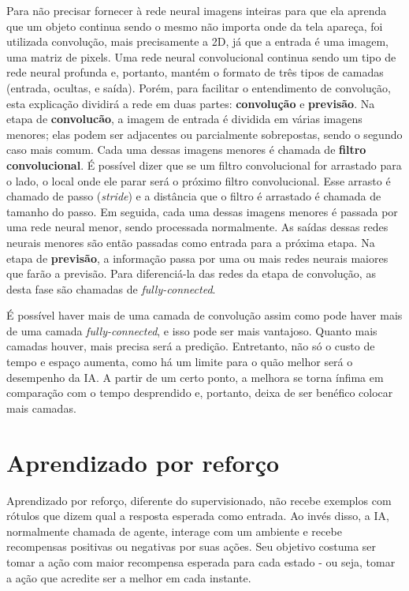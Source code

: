 Para não precisar fornecer à rede neural imagens inteiras para que ela aprenda que um objeto continua sendo o mesmo não importa onde da tela apareça, foi utilizada convolução, mais precisamente a 2D, já que a entrada é uma imagem, uma matriz de pixels.
Uma rede neural convolucional continua sendo um tipo de rede neural profunda e, portanto, mantém o formato de três tipos de camadas (entrada, ocultas, e saída). Porém, para facilitar o entendimento de convolução, esta explicação dividirá a rede em duas partes: \textbf{convolução} e \textbf{previsão}.
Na etapa de \textbf{convolucão}, a imagem de entrada é dividida em várias imagens menores; elas podem ser adjacentes ou parcialmente sobrepostas, sendo o segundo caso mais comum. Cada uma dessas imagens menores é chamada de \textbf{filtro convolucional}. É possível dizer que se um filtro convolucional for arrastado para o lado, o local onde ele parar será o próximo filtro convolucional. Esse arrasto é chamado de passo (\textit{stride}) e a distância que o filtro é arrastado é chamada de tamanho do passo. Em seguida, cada uma dessas imagens menores é passada por uma rede neural menor, sendo processada normalmente. As saídas dessas redes neurais menores são então passadas como entrada para a próxima etapa.
Na etapa de \textbf{previsão}, a informação passa por uma ou mais redes neurais maiores que farão a previsão. Para diferenciá-la das redes da etapa de convolução, as desta fase são chamadas de \textit{fully-connected}.

É possível haver mais de uma camada de convolução assim como pode haver mais de uma camada \textit{fully-connected}, e isso pode ser mais vantajoso. Quanto mais camadas houver, mais precisa será a predição. Entretanto, não só o custo de tempo e espaço aumenta, como há um limite para o quão melhor será o desempenho da IA. A partir de um certo ponto, a melhora se torna ínfima em comparação com o tempo desprendido e, portanto, deixa de ser benéfico colocar mais camadas.


\section{Aprendizado por reforço}
\label{sec:rl}

Aprendizado por reforço, diferente do supervisionado, não recebe exemplos com rótulos que dizem qual a resposta esperada como entrada.
Ao invés disso, a IA, normalmente chamada de agente, interage com um ambiente e recebe recompensas positivas ou negativas por suas ações.
Seu objetivo costuma ser tomar a ação com maior recompensa esperada para cada estado - ou seja, tomar a ação que acredite ser a melhor em cada instante.

